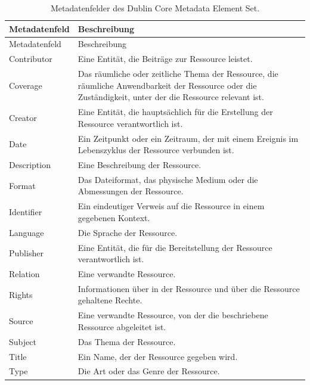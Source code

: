 \documentclass[
  letterpaper,
  DIV=11,
  numbers=noendperiod]{scrartcl}
\begin{document}
\begin{longtable}[]{@{}
  >{\raggedright\arraybackslash}p{}
  >{\raggedright\arraybackslash}p{}@{}}
\caption{Metadatenfelder des Dublin Core Metadata Element
Set.}\tabularnewline
\toprule\noalign{}
\begin{minipage}[b]{\linewidth}\raggedright
Metadatenfeld
\end{minipage} & \begin{minipage}[b]{\linewidth}\raggedright
Beschreibung
\end{minipage} \\
\midrule\noalign{}
\endfirsthead
\toprule\noalign{}
\begin{minipage}[b]{\linewidth}\raggedright
Metadatenfeld
\end{minipage} & \begin{minipage}[b]{\linewidth}\raggedright
Beschreibung
\end{minipage} \\
\midrule\noalign{}
\endhead
\bottomrule\noalign{}
\endlastfoot
Contributor & Eine Entität, die Beiträge zur Ressource leistet. \\
Coverage & Das räumliche oder zeitliche Thema der Ressource, die
räumliche Anwendbarkeit der Ressource oder die Zuständigkeit, unter der
die Ressource relevant ist. \\
Creator & Eine Entität, die hauptsächlich für die Erstellung der
Ressource verantwortlich ist. \\
Date & Ein Zeitpunkt oder ein Zeitraum, der mit einem Ereignis im
Lebenszyklus der Ressource verbunden ist. \\
Description & Eine Beschreibung der Ressource. \\
Format & Das Dateiformat, das physische Medium oder die Abmessungen der
Ressource. \\
Identifier & Ein eindeutiger Verweis auf die Ressource in einem
gegebenen Kontext. \\
Language & Die Sprache der Ressource. \\
Publisher & Eine Entität, die für die Bereitstellung der Ressource
verantwortlich ist. \\
Relation & Eine verwandte Ressource. \\
Rights & Informationen über in der Ressource und über die Ressource
gehaltene Rechte. \\
Source & Eine verwandte Ressource, von der die beschriebene Ressource
abgeleitet ist. \\
Subject & Das Thema der Ressource. \\
Title & Ein Name, der der Ressource gegeben wird. \\
Type & Die Art oder das Genre der Ressource. \\
\end{longtable}
\end{document}
